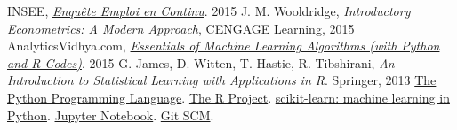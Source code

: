 \documentclass[a4paper]{article}
\begin{document}
\clearpage
\begin{thebibliography}{9}
        INSEE,
        \href{https://www.insee.fr/fr/statistiques/2388681}{\emph{Enqu\^ete Emploi en Continu}}.
        2015
        J. M. Wooldridge,
        \emph{Introductory Econometrics: A Modern Approach},
        CENGAGE Learning,
        2015
        AnalyticsVidhya.com,
        \href{https://www.analyticsvidhya.com/blog/2015/08/common-machine-learning-algorithms/}{\emph{Essentials of Machine Learning Algorithms (with Python and R Codes)}}.
        2015
        G. James, D. Witten, T. Hastie, R. Tibshirani,
        \emph{An Introduction to Statistical Learning with Applications in R}.
        Springer,
        2013
        \href{https://www.python.org/}{The Python Programming Language}.
        \href{https://www.r-project.org/}{The R Project}.
        \href{http://scikit-learn.org/}{scikit-learn: machine learning in Python}.
        \href{https://jupyter.org/}{Jupyter Notebook}.
        \href{https://git-scm.com/}{Git SCM}.
\end{thebibliography}
\end{document}
